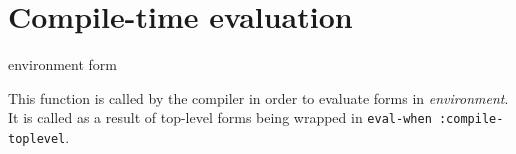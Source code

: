 \section{Compile-time evaluation}
\label{sec-environment-compile-time-evaluation}

 {environment form}

This function is called by the compiler in order to evaluate forms in
\textit{environment}.  It is called as a result of top-level forms
being wrapped in \texttt{eval-when :compile-toplevel}. 

